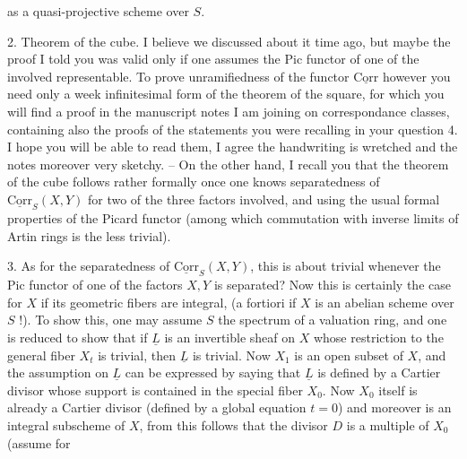 \documentclass[11pt,a4paper]{article}
\begin{document}
as a quasi-projective scheme over $S$.

2. Theorem of the cube. I believe we discussed about it time ago, but maybe
the proof I told you was valid only if one assumes the Pic functor of one of
the \struck{\ill{}}  involved representable. To prove
unramifiedness of the functor $\underline{\mathrm{Corr}}$ however you need
only a week infinitesimal form of the theorem of the square, for which you
will find a proof in the manuscript notes I am joining on correspondance
classes, containing also the proofs of the statements you were recalling in
your question 4. I hope you will be able to read them, I agree the
handwriting is wretched and the notes moreover very sketchy. -- On the other
hand, I recall you that the theorem of the cube follows rather formally once
one knows separatedness of $\underline{\mathrm{Corr}}_S(X,Y)$ for two of the
three factors involved, and using the usual formal properties of the Picard
functor (among which commutation with inverse limits of Artin rings is the
less trivial).

3. As for the separatedness of $\underline{\mathrm{Corr}}_S(X,Y)$, this is
about trivial whenever the Pic functor of one of the factors $X,Y$ is
separated? Now this is certainly the case for $X$ if its geometric fibers are
integral, (a fortiori if $X$ is an abelian scheme over $S$ !). To show this,
one may assume $S$ the spectrum of a  valuation ring, and one is
reduced to show that if $\underline{L}$ is an invertible sheaf on $X$ whose
restriction to the general fiber $X_t$ is trivial, then $\underline{L}$ is
trivial. Now $X_1$ is an open subset of $X$, and the assumption on
$\underline{L}$ can be expressed by saying that $\underline{L}$ is defined by
a Cartier divisor whose support is contained in the special fiber $X_0$. Now
$X_0$ itself is already a Cartier divisor (defined by a global equation
$t = 0$) and moreover is an integral subscheme of $X$, from this follows that
the divisor $D$ is a multiple of $X_0$ (assume for
\end{document}
